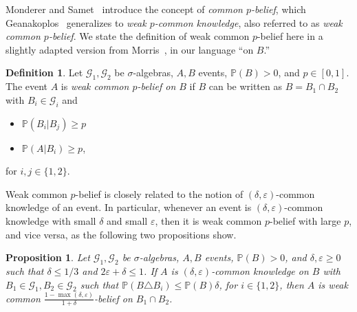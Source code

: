 \documentclass[a4paper, 10pt]{article}
\numberwithin{theorem}{section}
\newtheorem{prop}[theorem]{Proposition}
\theoremstyle{definition}
\newtheorem{definition}[theorem]{Definition}
\newcommand{\G}{\mathcal{G}}
\renewcommand{\epsilon}{\varepsilon}
\renewcommand{\P}{\mathbb{P}}
\begin{document}
Monderer and Samet~\cite{MoSa89} introduce the concept of \emph{common $p$-belief}, which Geanakoplos~\cite{Ge94} generalizes to \emph{weak $p$-common knowledge}, also referred to as  \emph{weak common $p$-belief}. We state the definition of  weak common $p$-belief here in a slightly adapted version from Morris~\cite[Proposition 9]{Mo99}, in our language ``on $B$.''






\begin{definition}
	Let $\G_1,\G_2$ be $\sigma$-algebras, $A,B$ events, $\P(B)>0$, and $p \in [0,1]$. The event $A$ is \emph{weak common $p$-belief on $B$} if $B$ can be written as $B=B_1\cap B_2$ with $B_i \in \G_i$ and
	\begin{itemize}
		\item [(1)] $\P(B_i|B_j) \geq p$
		\item [(2)] $\P(A|B_i) \geq p$,
	\end{itemize}
	for $i,j \in \{1,2\}$.
\end{definition}



Weak common $p$-belief is closely related to the notion of $(\delta,\epsilon)$-common knowledge of an event. In particular, whenever an event is  $(\delta,\epsilon)$-common knowledge with small $\delta$ and small $\epsilon$, then it is weak common $p$-belief with large $p$, and vice versa, as the following two propositions show.

\begin{prop}\label{lemma:delta_to_p}
	Let $\G_1,\G_2$ be $\sigma$-algebras, $A,B$ events, $\P(B)>0$, and $\delta,\epsilon \geq 0$ such that $\delta \leq 1/3$ and $2\epsilon + \delta \leq 1$. If $A$ is $(\delta, \epsilon)$-common knowledge on $B$ with $B_1 \in \G_1, B_2 \in \G_2$ such that $\P(B \triangle B_i) \leq \P(B) \delta$, for $i \in \{1,2\}$, then $A$ is weak common $\frac{1-\max(\delta,\epsilon)}{1+\delta}$-belief on  $B_1 \cap B_2$.
\end{prop}
\end{document}
